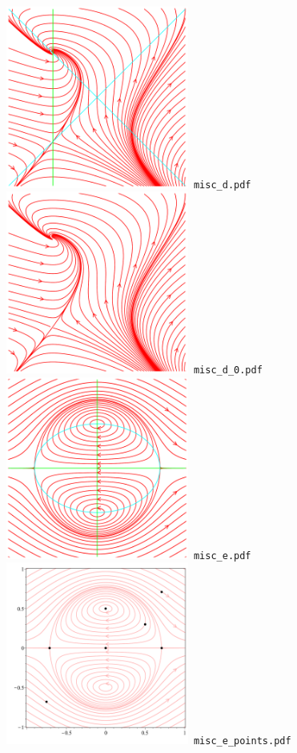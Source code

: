 \documentclass[a4paper]{amsart}
\begin{document}
\includegraphics[width=6cm]{misc_d.pdf}\verb+ misc_d.pdf+\\
\includegraphics[width=6cm]{misc_d_0.pdf}\verb+ misc_d_0.pdf+\\
\includegraphics[width=6cm]{misc_e.pdf}\verb+ misc_e.pdf+\\
\includegraphics[width=6cm]{misc_e_points.pdf}\verb+ misc_e_points.pdf+\\
\end{document}
